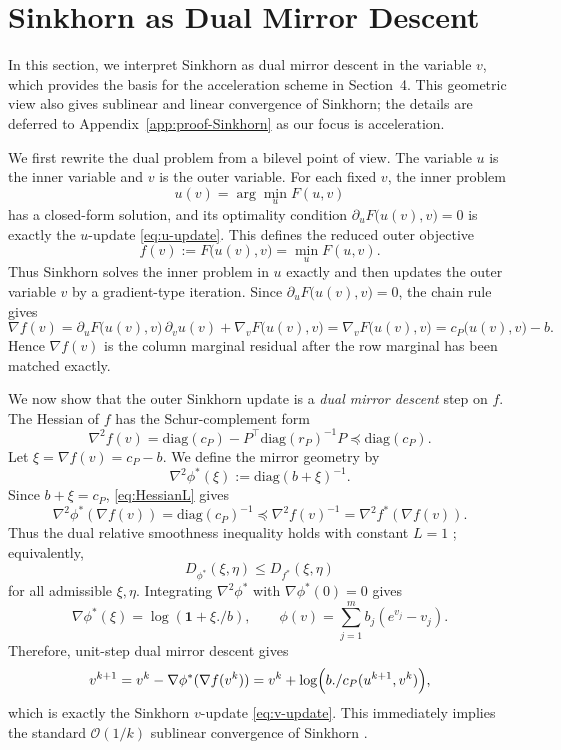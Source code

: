 \documentclass{article}
\theoremstyle{plain}
\theoremstyle{remark}
\begin{document}
\section{Sinkhorn as Dual Mirror Descent}
\label{sec:sinkhorn-dmd}
In this section, we interpret Sinkhorn as dual mirror descent in the variable $v$, which provides the basis for the acceleration scheme in Section~4. This geometric view also gives sublinear and linear convergence of Sinkhorn; the details are deferred to Appendix~\ref{app:proof-Sinkhorn} as our focus is acceleration.

We first rewrite the dual problem from a bilevel point of view. The variable $u$ is the inner variable and $v$ is the outer variable. For each fixed $v$, the inner problem
$$
u(v)=\arg\min_u F(u,v)
$$
has a closed-form solution, and its optimality condition $\partial_u F\bigl(u(v),v\bigr)=0$ is exactly the $u$-update \eqref{eq:u-update}. This defines the reduced outer objective
\begin{equation}
f(v):=F\bigl(u(v),v\bigr)=\min_u F(u,v).
\end{equation}
Thus Sinkhorn solves the inner problem in $u$ exactly and then updates the outer variable $v$ by a gradient-type iteration. Since $\partial_u F\bigl(u(v),v\bigr)=0$, the chain rule gives
\begin{equation}\label{eq:grad-f}
\nabla f(v)
=
\partial_u F\bigl(u(v),v\bigr)\,\partial_v u(v)
+\nabla_v F\bigl(u(v),v\bigr)
=
\nabla_v F\bigl(u(v),v\bigr)
=
c_P\bigl(u(v),v\bigr)-b.
\end{equation}
Hence $\nabla f(v)$ is the column marginal residual after the row marginal has been matched exactly.

We now show that the outer Sinkhorn update is a \emph{dual mirror descent} step on $f$. The Hessian of $f$ has the Schur-complement form
\begin{equation}\label{eq:HessianL}
\nabla^2 f(v)=\mathrm{diag}(c_P)-P^\top \mathrm{diag}(r_P)^{-1}P\preceq \mathrm{diag}(c_P).
\end{equation}
Let $\xi=\nabla f(v)=c_P-b$. We define the mirror geometry by
$$
\nabla^2\phi^*(\xi):=\mathrm{diag}(b+\xi)^{-1}.
$$
Since $b+\xi=c_P$, \eqref{eq:HessianL} gives
$$
\nabla^2\phi^*(\nabla f(v))=\mathrm{diag}(c_P)^{-1}\preceq \nabla^2 f(v)^{-1}=\nabla^2 f^*(\nabla f(v)).
$$
Thus the dual relative smoothness inequality holds with constant $L=1$ \citep{maddison2021dual}; equivalently,
$$
D_{\phi^*}(\xi,\eta)\le D_{f^*}(\xi,\eta)
$$
for all admissible $\xi,\eta$. Integrating $\nabla^2\phi^*$ with $\nabla\phi^*(0)=0$ gives
$$
\nabla\phi^*(\xi)=\log(\mathbf{1}+\xi./b),
\qquad
\phi(v)=\sum_{j=1}^m b_j(e^{v_j}-v_j).
$$
Therefore, unit-step dual mirror descent gives
\begin{equation}\label{eq:md-general}
v^{k+1}=v^k-\nabla\phi^*(\nabla f(v^k))
=v^k+\log \Bigl(b./c_P(u^{k+1},v^k)\Bigr),
\end{equation}
which is exactly the Sinkhorn $v$-update \eqref{eq:v-update}.
This immediately implies the standard $\mathcal{O}(1/k)$ sublinear convergence of Sinkhorn \cite{maddison2021dual}. 
\end{document}
